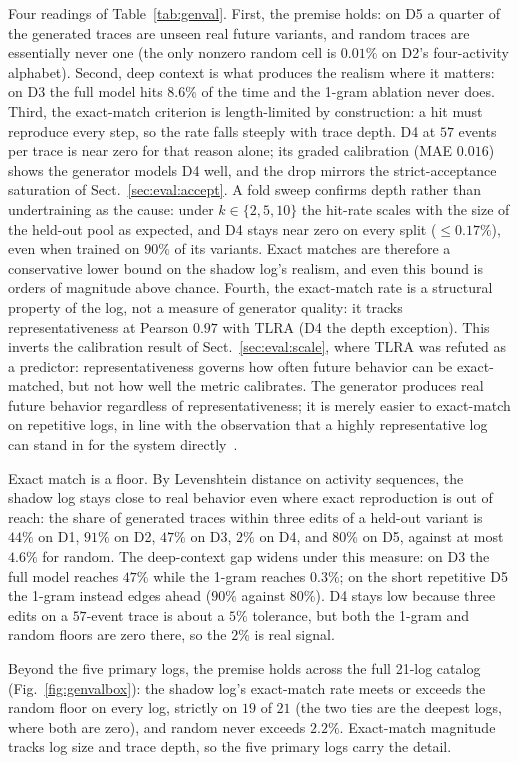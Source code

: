 \documentclass[runningheads]{llncs}
\begin{document}
{Four readings of Table~\ref{tab:genval}. First, the premise holds: on D5 a quarter of the generated traces are unseen real future variants, and random traces are essentially never one (the only nonzero random cell is $0.01\%$ on D2's four-activity alphabet). Second, deep context is what produces the realism where it matters: on D3 the full model hits $8.6\%$ of the time and the 1-gram ablation never does. Third, the exact-match criterion is length-limited by construction: a hit must reproduce every step, so the rate falls steeply with trace depth. D4 at $57$ events per trace is near zero for that reason alone; its graded calibration (MAE $0.016$) shows the generator models D4 well, and the drop mirrors the strict-acceptance saturation of Sect.~\ref{sec:eval:accept}. A fold sweep confirms depth rather than undertraining as the cause: under $k\in\{2,5,10\}$ the hit-rate scales with the size of the held-out pool as expected, and D4 stays near zero on every split ($\le 0.17\%$), even when trained on $90\%$ of its variants. Exact matches are therefore a conservative lower bound on the shadow log's realism, and even this bound is orders of magnitude above chance. Fourth, the exact-match rate is a structural property of the log, not a measure of generator quality: it tracks representativeness at Pearson $0.97$ with TLRA (D4 the depth exception). This inverts the calibration result of Sect.~\ref{sec:eval:scale}, where TLRA was refuted as a predictor: representativeness governs how often future behavior can be exact-matched, but not how well the metric calibrates. The generator produces real future behavior regardless of representativeness; it is merely easier to exact-match on repetitive logs, in line with the observation that a highly representative log can stand in for the system directly~\cite{karunaratne2024representativeness}.

Exact match is a floor. By Levenshtein distance on activity sequences, the shadow log stays close to real behavior even where exact reproduction is out of reach: the share of generated traces within three edits of a held-out variant is $44\%$ on D1, $91\%$ on D2, $47\%$ on D3, $2\%$ on D4, and $80\%$ on D5, against at most $4.6\%$ for random. The deep-context gap widens under this measure: on D3 the full model reaches $47\%$ while the 1-gram reaches $0.3\%$; on the short repetitive D5 the 1-gram instead edges ahead ($90\%$ against $80\%$). D4 stays low because three edits on a $57$-event trace is about a $5\%$ tolerance, but both the 1-gram and random floors are zero there, so the $2\%$ is real signal.

Beyond the five primary logs, the premise holds across the full 21-log catalog (Fig.~\ref{fig:genvalbox}): the shadow log's exact-match rate meets or exceeds the random floor on every log, strictly on $19$ of $21$ (the two ties are the deepest logs, where both are zero), and random never exceeds $2.2\%$. Exact-match magnitude tracks log size and trace depth, so the five primary logs carry the detail.
}
\end{document}
